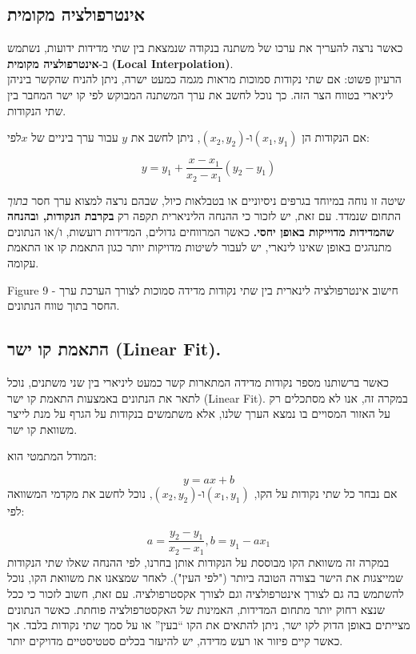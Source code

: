 \documentclass[
  hebrew,
  letterpaper,
  DIV=11,
  numbers=noendperiod]{scrreprt}
\begin{document}
\subsection{\texorpdfstring{{אינטרפולציה
מקומית}}{אינטרפולציה מקומית}}\label{ux5d0ux5d9ux5e0ux5d8ux5e8ux5e4ux5d5ux5dcux5e6ux5d9ux5d4-ux5deux5e7ux5d5ux5deux5d9ux5ea}

{כאשר נרצה להעריך את ערכו של משתנה בנקודה שנמצאת בין שתי מדידות ידועות},
{נשתמש ב-\textbf{אינטרפולציה מקומית}} \textbf{(Local Interpolation)}.\\
{הרעיון פשוט: אם שתי נקודות סמוכות מראות מגמה כמעט ישרה, ניתן להניח
שהקשר ביניהן ליניארי בטווח הצר הזה. כך נוכל לחשב את ערך המשתנה המבוקש
לפי קו ישר המחבר בין שתי הנקודות}.

{אם הנקודות הן} \((x_{1},y_{1})\){ו-}\((x_{2},y_{2})\), {ניתן לחשב את}
\(y\) {עבור ערך ביניים של} \(x\){לפי}:

\[y = y_{1} + \frac{x - x_{1}}{x_{2} - x_{1}}(y_{2} - y_{1})\]

{שיטה זו נוחה במיוחד בגרפים ניסיוניים או בטבלאות כיול, שבהם נרצה למצוא
ערך חסר \emph{בתוך} התחום שנמדד}. {עם זאת, יש לזכור כי ההנחה הליניארית
תקפה רק \textbf{בקרבת הנקודות, ובהנחה שהמדידות מדוייקות באופן יחסי.}}
{כאשר המרווחים גדולים, המדידות רועשות, ו/או הנתונים מתנהגים באופן שאינו
לינארי, יש לעבור לשיטות מדויקות יותר כגון התאמת קו או התאמת עקומה}.

Figure {9 - חישוב אינטרפולציה לינארית בין שתי נקודות מדידה סמוכות לצורך
הערכת ערך החסר בתוך טווח הנתונים.}

\subsection{\texorpdfstring{{התאמת קו ישר} (Linear
Fit){.}}{התאמת קו ישר (Linear Fit).}}\label{ux5d4ux5eaux5d0ux5deux5ea-ux5e7ux5d5-ux5d9ux5e9ux5e8-linear-fit.}

{כאשר ברשותנו מספר נקודות מדידה המתארות קשר כמעט ליניארי בין שני משתנים,
נוכל לתאר את הנתונים באמצעות התאמת קו ישר} (Linear Fit){.} {במקרה זה,
אנו לא מסתכלים רק על האזור המסויים בו נמצא הערך שלנו, אלא משתמשים
בנקודות על הגרף על מנת לייצר משוואת קו ישר}.

{המודל המתמטי הוא}:

\[y = ax + b\] {אם נבחר כל שתי נקודות על הקו},
\((x_{1},y_{1})\){ו-}\((x_{2},y_{2})\), {נוכל לחשב את מקדמי המשוואה
לפי}:

\[a = \frac{y_{2} - y_{1}}{x_{2} - x_{1}},b = y_{1} - ax_{1}\] {במקרה זה
משוואת הקו מבוססת על הנקודות אותן בחרנו, לפי ההנחה שאלו שתי הנקודות
שמייצגות את הישר בצורה הטובה ביותר ("לפי העין"). לאחר שמצאנו את משוואת
הקו, נוכל להשתמש בה גם לצורך אינטרפולציה וגם לצורך אקסטרפולציה. עם זאת,
חשוב לזכור כי ככל שנצא רחוק יותר מתחום המדידות}, {האמינות של
האקסטרפולציה פוחתת}. {כאשר הנתונים מצייתים באופן הדוק לקו ישר, ניתן
להתאים את הקו ``בעין'' או על סמך שתי נקודות בלבד. אך כאשר קיים פיזור או
רעש מדידה, יש להיעזר בכלים סטטיסטיים מדויקים יותר.}
\end{document}
